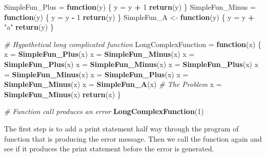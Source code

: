 \documentclass[
]{book}
\newenvironment{Shaded}{\begin{snugshade}}{\end{snugshade}}
\newcommand{\CommentTok}[1]{\textcolor[rgb]{0.56,0.35,0.01}{\textit{#1}}}
\newcommand{\ControlFlowTok}[1]{\textcolor[rgb]{0.13,0.29,0.53}{\textbf{#1}}}
\newcommand{\DecValTok}[1]{\textcolor[rgb]{0.00,0.00,0.81}{#1}}
\newcommand{\KeywordTok}[1]{\textcolor[rgb]{0.13,0.29,0.53}{\textbf{#1}}}
\newcommand{\NormalTok}[1]{#1}
\newcommand{\OperatorTok}[1]{\textcolor[rgb]{0.81,0.36,0.00}{\textbf{#1}}}
\newcommand{\StringTok}[1]{\textcolor[rgb]{0.31,0.60,0.02}{#1}}
\begin{document}
\begin{Shaded}
\begin{Highlighting}[]
\NormalTok{SimpleFun_Plus =}\StringTok{ }\ControlFlowTok{function}\NormalTok{(y) \{}
\NormalTok{    y =}\StringTok{ }\NormalTok{y }\OperatorTok{+}\StringTok{ }\DecValTok{1}
    \KeywordTok{return}\NormalTok{(y)}
\NormalTok{\}}
\NormalTok{SimpleFun_Minus =}\StringTok{ }\ControlFlowTok{function}\NormalTok{(y) \{}
\NormalTok{    y =}\StringTok{ }\NormalTok{y }\OperatorTok{-}\StringTok{ }\DecValTok{1}
    \KeywordTok{return}\NormalTok{(y)}
\NormalTok{\}}
\NormalTok{SimpleFun_A <-}\StringTok{ }\ControlFlowTok{function}\NormalTok{(y) \{}
\NormalTok{    y =}\StringTok{ }\NormalTok{y }\OperatorTok{+}\StringTok{ "a"}
    \KeywordTok{return}\NormalTok{(y)}
\NormalTok{\}}



\CommentTok{# Hypothetical long complicated function}
\NormalTok{LongComplexFunction =}\StringTok{ }\ControlFlowTok{function}\NormalTok{(x) \{}
\NormalTok{    x =}\StringTok{ }\KeywordTok{SimpleFun_Plus}\NormalTok{(x)}
\NormalTok{    x =}\StringTok{ }\KeywordTok{SimpleFun_Minus}\NormalTok{(x)}
\NormalTok{    x =}\StringTok{ }\KeywordTok{SimpleFun_Plus}\NormalTok{(x)}
\NormalTok{    x =}\StringTok{ }\KeywordTok{SimpleFun_Minus}\NormalTok{(x)}
\NormalTok{    x =}\StringTok{ }\KeywordTok{SimpleFun_Plus}\NormalTok{(x)}
\NormalTok{    x =}\StringTok{ }\KeywordTok{SimpleFun_Minus}\NormalTok{(x)}
\NormalTok{    x =}\StringTok{ }\KeywordTok{SimpleFun_Plus}\NormalTok{(x)}
\NormalTok{    x =}\StringTok{ }\KeywordTok{SimpleFun_Minus}\NormalTok{(x)}
\NormalTok{    x =}\StringTok{ }\KeywordTok{SimpleFun_A}\NormalTok{(x)  }\CommentTok{# The Problem }
\NormalTok{    x =}\StringTok{ }\KeywordTok{SimpleFun_Minus}\NormalTok{(x)}
    \KeywordTok{return}\NormalTok{(x)}
\NormalTok{\}}

\CommentTok{# Function call produces an error}
\KeywordTok{LongComplexFunction}\NormalTok{(}\DecValTok{1}\NormalTok{)}
\end{Highlighting}
\end{Shaded}

The first step is to add a print statement half way through the program of function that is producing the error message. Then we call the function again and see if it produces the print statement before the error is generated.
\end{document}
